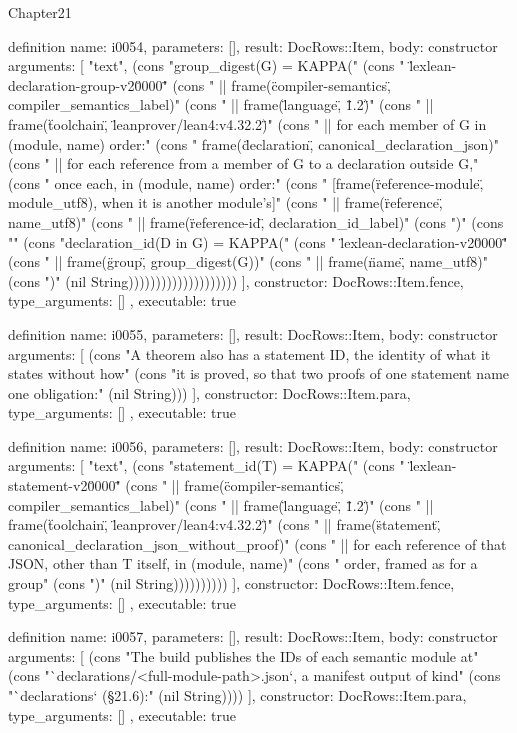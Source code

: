\begin{lexlean}{Chapter21}
\begin{semanticmodule}
definition{
  name: i0054,
  parameters: [],
  result: DocRows::Item,
  body: constructor{
    arguments: [
      "text",
      (cons "group_digest(G) = KAPPA(" (cons "  \"lexlean-declaration-group-v2\u0000\"" (cons "  || frame(\"compiler-semantics\", compiler_semantics_label)" (cons "  || frame(\"language\", \"1.2\")" (cons "  || frame(\"toolchain\", \"leanprover/lean4:v4.32.2\")" (cons "  || for each member of G in (module, name) order:" (cons "       frame(\"declaration\", canonical_declaration_json)" (cons "  || for each reference from a member of G to a declaration outside G," (cons "     once each, in (module, name) order:" (cons "       [frame(\"reference-module\", module_utf8), when it is another module's]" (cons "       || frame(\"reference\", name_utf8)" (cons "       || frame(\"reference-id\", declaration_id_label)" (cons ")" (cons "" (cons "declaration_id(D in G) = KAPPA(" (cons "  \"lexlean-declaration-v2\u0000\"" (cons "  || frame(\"group\", group_digest(G))" (cons "  || frame(\"name\", name_utf8)" (cons ")" (nil String))))))))))))))))))))
    ],
    constructor: DocRows::Item.fence,
    type_arguments: []
  },
  executable: true
}

definition{
  name: i0055,
  parameters: [],
  result: DocRows::Item,
  body: constructor{
    arguments: [
      (cons "A theorem also has a statement ID, the identity of what it states without how" (cons "it is proved, so that two proofs of one statement name one obligation:" (nil String)))
    ],
    constructor: DocRows::Item.para,
    type_arguments: []
  },
  executable: true
}

definition{
  name: i0056,
  parameters: [],
  result: DocRows::Item,
  body: constructor{
    arguments: [
      "text",
      (cons "statement_id(T) = KAPPA(" (cons "  \"lexlean-statement-v2\u0000\"" (cons "  || frame(\"compiler-semantics\", compiler_semantics_label)" (cons "  || frame(\"language\", \"1.2\")" (cons "  || frame(\"toolchain\", \"leanprover/lean4:v4.32.2\")" (cons "  || frame(\"statement\", canonical_declaration_json_without_proof)" (cons "  || for each reference of that JSON, other than T itself, in (module, name)" (cons "     order, framed as for a group" (cons ")" (nil String))))))))))
    ],
    constructor: DocRows::Item.fence,
    type_arguments: []
  },
  executable: true
}

definition{
  name: i0057,
  parameters: [],
  result: DocRows::Item,
  body: constructor{
    arguments: [
      (cons "The build publishes the IDs of each semantic module at" (cons "`declarations/<full-module-path>.json`, a manifest output of kind" (cons "`declarations` (§21.6):" (nil String))))
    ],
    constructor: DocRows::Item.para,
    type_arguments: []
  },
  executable: true
}


\end{semanticmodule}
\end{lexlean}
